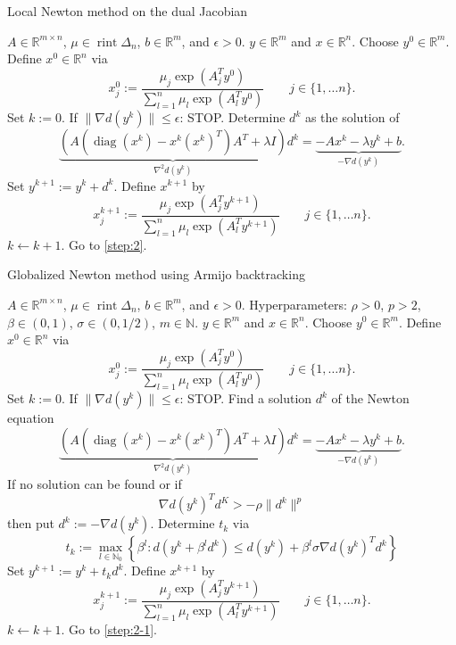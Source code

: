 \documentclass[10pt,a4paper]{article}
\numberwithin{equation}{section}
\theoremstyle{definition}
\def\rr{{\mathbb R}}
\def\nn{{\mathbb N}}
\DeclareMathOperator{\diag}{diag}
\DeclareMathOperator{\rint}{rint}
\begin{document}
\begin{algorithm}[h]
\caption{Local Newton method on the dual Jacobian}\label{alg:1}
\begin{algorithmic}[1]
\Require $A \in \rr^{m \times n}$, $\mu \in \rint \Delta_n$, $b \in \rr^m$, and $\epsilon > 0$.
\Ensure $y \in \rr^m$ and $x \in \rr^n$.
\State Choose $y^0 \in \rr^m$. Define $x^0 \in \rr^n$ via \[
x_j^0 := \frac{\mu_j \exp(A_j^Ty^0)}{\sum_{l=1}^n \mu_l \exp(A_l^Ty^0)} \qquad j \in \{1, \dots n\}.
\]
Set $k:= 0$.
\State If $\lVert \nabla d(y^k) \rVert \leq \epsilon$: STOP. \label{step:2}
\State Determine $d^k$ as the solution of \[
\underbrace{(A(\diag(x^k) - x^k (x^k)^T)A^T + \lambda I)}_{\nabla^2 d(y^k)}d^k = \underbrace{-Ax^k - \lambda y^k + b}_{- \nabla d(y^k)}.
\]
Set $y^{k+1} := y^k + d^k$. Define $x^{k+1}$ by 
\[
x_j^{k+1}:=\frac{\mu_j \exp(A_j^Ty^{k+1})}{\sum_{l=1}^n \mu_l \exp(A_l^Ty^{k+1})} \qquad j \in \{1, \dots n\}.
\]
\State $k \gets k+1$. Go to \eqref{step:2}.
\end{algorithmic}
\end{algorithm}

\begin{algorithm}[h]
\caption{Globalized Newton method using Armijo backtracking}\label{alg:armijo}
\begin{algorithmic}[1]
\Require $A \in \rr^{m \times n}$, $\mu \in \rint \Delta_n$, $b \in \rr^m$, and $\epsilon > 0$. Hyperparameters: $\rho>0$, $p > 2$, $\beta \in (0,1)$, $\sigma \in (0, 1/2)$, $m \in \nn$.
\Ensure $y \in \rr^m$ and $x \in \rr^n$.
\State Choose $y^0 \in \rr^m$. Define $x^0 \in \rr^n$ via \[
x_j^0 := \frac{\mu_j \exp(A_j^Ty^0)}{\sum_{l=1}^n \mu_l \exp(A_l^Ty^0)} \qquad j \in \{1, \dots n\}.
\]
Set $k:= 0$.
\State If $\lVert \nabla d(y^k) \rVert \leq \epsilon$: STOP. \label{step:2-1}
\State Find a solution $d^k$ of the Newton equation \[
\underbrace{(A(\diag(x^k) - x^k (x^k)^T)A^T + \lambda I)}_{\nabla^2 d(y^k)}d^k = \underbrace{-Ax^k - \lambda y^k + b}_{- \nabla d(y^k)}.
\]
If no solution can be found or if \[
\nabla d(y^k)^Td^K > -\rho \lVert d^k \rVert^p
\]
then put $d^k := - \nabla d(y^k)$.
\State Determine $t_k$ via 
\[
t_k := \max_{l \in \nn_0} \left\{ \beta^l : d(y^k + \beta^ld^k) \leq d(y^k) + \beta^l\sigma \nabla d(y^k)^T d^k \right\}
\]
\State Set $y^{k+1} := y^k + t_k d^k$. Define $x^{k+1}$ by 
\[
x_j^{k+1}:=\frac{\mu_j \exp(A_j^Ty^{k+1})}{\sum_{l=1}^n \mu_l \exp(A_l^Ty^{k+1})} \qquad j \in \{1, \dots n\}.
\]
\State $k \gets k+1$. Go to \eqref{step:2-1}.
\end{algorithmic}
\end{algorithm}
\end{document}
